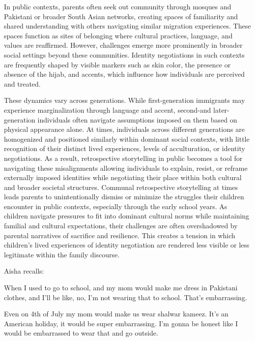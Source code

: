 In public contexts, parents often seek out community through mosques and Pakistani or broader South Asian networks, creating spaces of familiarity and shared understanding with others navigating similar migration experiences. These spaces function as sites of belonging where cultural practices, language, and values are reaffirmed. However, challenges emerge more prominently in broader social settings beyond these communities. Identity negotiations in such contexts are frequently shaped by visible markers such as skin color, the presence or absence of the hijab, and accents, which influence how individuals are perceived and treated.

These dynamics vary across generations. While first-generation immigrants may experience marginalization through language and accent, second-and later-generation individuals often navigate assumptions imposed on them based on physical appearance alone. At times, individuals across different generations are homogenized and positioned similarly within dominant social contexts, with little recognition of their distinct lived experiences, levels of acculturation, or identity negotiations. As a result, retrospective storytelling in public becomes a tool for navigating these misalignments allowing individuals to explain, resist, or reframe externally imposed identities while negotiating their place within both cultural and broader societal structures.
Communal retrospective storytelling at times leads parents to unintentionally dismiss or minimize the struggles their children encounter in public contexts, especially through the early school years. As children navigate pressures to fit into dominant cultural norms while maintaining familial and cultural expectations, their challenges are often overshadowed by parental narratives of sacrifice and resilience. This creates a tension in which children’s lived experiences of identity negotiation are rendered less visible or less legitimate within the family discourse.

Aisha recalls:

\begin{FoundPoem}
    
    When I used to go to school, 			and my mom would make
    me dress in Pakistani clothes, and I'll be like, no, I'm not wearing that to
    school. That's embarrassing. 


    Even on 4th of July my mom would make us wear shalwar kameez. It's an
    American holiday, it would be super embarrassing. I'm gonna be honest like I
    would be embarrassed to wear that and go outside.

\end{FoundPoem}

